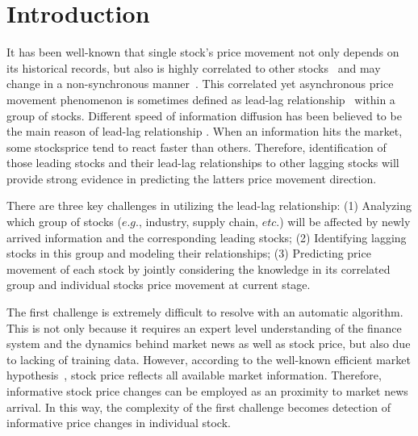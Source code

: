 \documentclass[sigconf,anonymous,review]{acmart}
\renewcommand{\cite}{\citep}
\begin{document}
\maketitle

\section{Introduction}
\label{sec:intro}

It has been well-known that single stock's price movement not only depends on its historical records, but also is highly correlated to other stocks~\cite{lo1990contrarian,mech1993portfolio} and may change in a non-synchronous
manner~\cite{lo1990contrarian,brennan1993investment}. This correlated yet asynchronous price movement phenomenon is sometimes defined as lead-lag relationship~\cite{hou2007industry} within a group of stocks.
Different speed of information diffusion has been believed to be
the main reason of lead-lag relationship
\cite{lo1990contrarian,badrinath1995shepherds,mcqueen1996delayed}.
When an information hits the market, some stocks\textquotesingle price tend to
react faster than others. Therefore, identification of those
leading stocks and their lead-lag relationships to other lagging
stocks will provide strong evidence in predicting the latter\textquotesingle s
price movement direction.

There are three key challenges in utilizing the lead-lag relationship: (1) Analyzing which group of stocks ($e.g.$, industry,
supply chain, $etc.$) will be affected by newly arrived information
and the corresponding leading stocks; (2) Identifying lagging stocks in this group and modeling their relationships; (3) Predicting
price movement of each stock by jointly considering the knowledge in its correlated group and individual stock\textquotesingle s price movement at current stage.

The first challenge is extremely difficult to resolve with an automatic algorithm. This is not only because it requires an expert level understanding of the finance system and the dynamics behind market news as well as stock price, but also due to lacking of training data. However, according to the well-known efficient market hypothesis~\cite{malkiel1970efficient}, stock price reflects all
available market information. Therefore, informative stock price changes can be employed as an proximity to market news arrival. In this way, the complexity of the first challenge becomes detection of informative price changes in individual stock.
\end{document}
